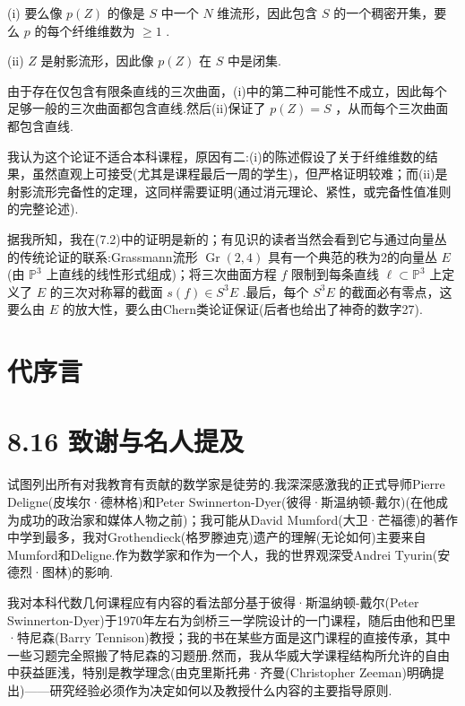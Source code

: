 (i) 要么像 \(p\left( Z\right)\) 的像是 \(S\) 中一个 \(N\) 维流形，因此包含 \(S\) 的一个稠密开集，要么 \(p\) 的每个纤维维数为 \(\geq  1\) .

(ii) \(Z\) 是射影流形，因此像 \(p\left( Z\right)\) 在 \(S\) 中是闭集.

由于存在仅包含有限条直线的三次曲面，(i)中的第二种可能性不成立，因此每个足够一般的三次曲面都包含直线.然后(ii)保证了 \(p\left( Z\right)  = S\) ，从而每个三次曲面都包含直线.

我认为这个论证不适合本科课程，原因有二:(i)的陈述假设了关于纤维维数的结果，虽然直观上可接受(尤其是课程最后一周的学生)，但严格证明较难；而(ii)是射影流形完备性的定理，这同样需要证明(通过消元理论、紧性，或完备性值准则的完整论述).

据我所知，我在(7.2)中的证明是新的；有见识的读者当然会看到它与通过向量丛的传统论证的联系:Grassmann流形 \(\operatorname{Gr}\left( {2,4}\right)\) 具有一个典范的秩为2的向量丛 \(E\) (由 \({\mathbb{P}}^{3}\) 上直线的线性形式组成)；将三次曲面方程 \(f\) 限制到每条直线 \(\ell  \subset  {\mathbb{P}}^{3}\) 上定义了 \(E\) 的三次对称幂的截面 \(s\left( f\right)  \in  {S}^{3}E\) .最后，每个 \({S}^{3}E\) 的截面必有零点，这要么由 \(E\) 的放大性，要么由Chern类论证保证(后者也给出了神奇的数字27).

\section{代序言}

\section{8.16 致谢与名人提及}

试图列出所有对我教育有贡献的数学家是徒劳的.我深深感激我的正式导师Pierre Deligne(皮埃尔·德林格)和Peter Swinnerton-Dyer(彼得·斯温纳顿-戴尔)(在他成为成功的政治家和媒体人物之前)；我可能从David Mumford(大卫·芒福德)的著作中学到最多，我对Grothendieck(格罗滕迪克)遗产的理解(无论如何)主要来自Mumford和Deligne.作为数学家和作为一个人，我的世界观深受Andrei Tyurin(安德烈·图林)的影响.

我对本科代数几何课程应有内容的看法部分基于彼得·斯温纳顿-戴尔(Peter Swinnerton-Dyer)于1970年左右为剑桥三一学院设计的一门课程，随后由他和巴里·特尼森(Barry Tennison)教授；我的书在某些方面是这门课程的直接传承，其中一些习题完全照搬了特尼森的习题册.然而，我从华威大学课程结构所允许的自由中获益匪浅，特别是教学理念(由克里斯托弗·齐曼(Christopher Zeeman)明确提出)——研究经验必须作为决定如何以及教授什么内容的主要指导原则.

